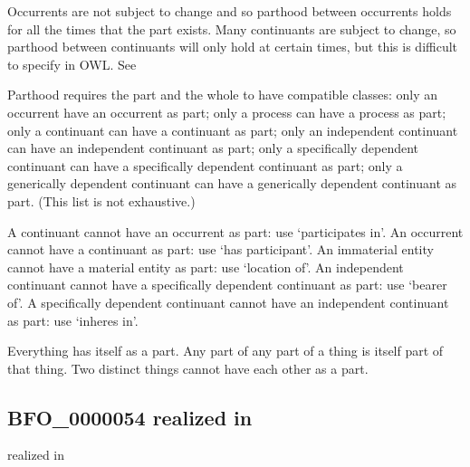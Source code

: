 \documentclass[letterpaper,10pt,english]{sphinxmanual}
\begin{document}
\begin{sphinxShadowBox}

\sphinxAtStartPar
Occurrents are not subject to change and so parthood between occurrents holds for all the times that the part exists. Many continuants are subject to change, so parthood between continuants will only hold at certain times, but this is difficult to specify in OWL. See 

\sphinxAtStartPar
Parthood requires the part and the whole to have compatible classes: only an occurrent have an occurrent as part; only a process can have a process as part; only a continuant can have a continuant as part; only an independent continuant can have an independent continuant as part; only a specifically dependent continuant can have a specifically dependent continuant as part; only a generically dependent continuant can have a generically dependent continuant as part. (This list is not exhaustive.)

\sphinxAtStartPar
A continuant cannot have an occurrent as part: use ‘participates in’. An occurrent cannot have a continuant as part: use ‘has participant’. An immaterial entity cannot have a material entity as part: use ‘location of’. An independent continuant cannot have a specifically dependent continuant as part: use ‘bearer of’. A specifically dependent continuant cannot have an independent continuant as part: use ‘inheres in’.

\sphinxAtStartPar
Everything has itself as a part. Any part of any part of a thing is itself part of that thing. Two distinct things cannot have each other as a part.
\end{sphinxShadowBox}

\begin{sphinxShadowBox}

\sphinxAtStartPar
{}
\end{sphinxShadowBox}
\begin{quote}

\ignorespaces \end{quote}


\subsection{BFO\_0000054 \sphinxhyphen{} realized in}
\label{\detokenize{doc-BFO_0000054:bfo-0000054-realized-in}}\label{\detokenize{doc-BFO_0000054:index-0}}\label{\detokenize{doc-BFO_0000054::doc}}
\begin{sphinxShadowBox}

\sphinxAtStartPar
realized in
\end{sphinxShadowBox}
\end{document}
